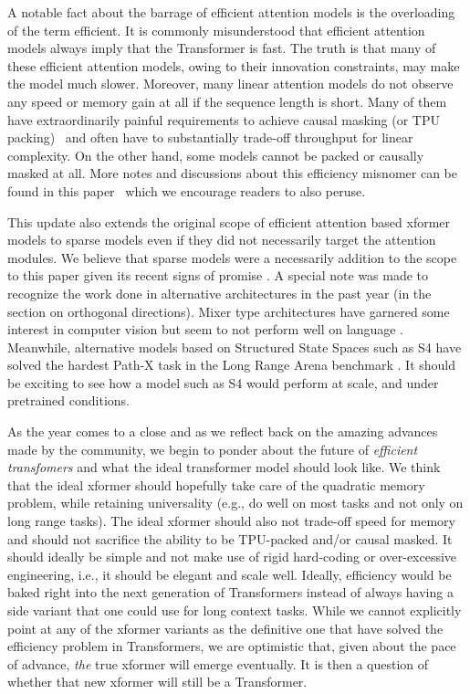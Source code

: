 A notable fact about the barrage of efficient attention models is the overloading of the term efficient. It is commonly misunderstood that efficient attention models always imply that the Transformer is fast. The truth is that many of these efficient attention models, owing to their innovation constraints, may make the model much slower. Moreover, many linear attention models do not observe any speed or memory gain at all if the sequence length is short. Many of them have extraordinarily painful requirements to achieve causal masking (or TPU packing)~\citep{choromanski2020rethinking,peng2021random,wang2020linformer} and often have to substantially trade-off throughput for linear complexity. On the other hand, some models cannot be packed or causally masked at all. More notes and discussions about this efficiency misnomer can be found in this paper~\citep{dehghani2021efficiency} which we encourage readers to also peruse.

This update also extends the original scope of efficient attention based xformer models to sparse models even if they did not necessarily target the attention modules. We believe that sparse models were a necessarily addition to the scope to this paper given its recent signs of promise \citep{fedus2021switch,du2021glam,zoph2022designing}. A special note was made to recognize the work done in alternative architectures in the past year (in the section on orthogonal directions). Mixer type architectures \citep{tolstikhin2021mlp} have garnered some interest in computer vision but seem to not perform well on language \citep{anonymous2021remixer}. Meanwhile, alternative models based on Structured State Spaces such as S4 \citep{gu2021efficiently} have solved the hardest Path-X task in the Long Range Arena benchmark \citep{tay2020long}. It should be exciting to see how a model such as S4 would perform at scale, and under pretrained conditions.

As the year comes to a close and as we reflect back on the amazing advances made by the community, we begin to ponder about the future of \textit{efficient transfomers} and what the ideal transformer model should look like. We think that the ideal xformer should hopefully take care of the quadratic memory problem, while retaining universality (e.g., do well on most tasks and not only on long range tasks). The ideal xformer should also not trade-off speed for memory and should not sacrifice the ability to be TPU-packed and/or causal masked. It should ideally be simple and not make use of rigid hard-coding or over-excessive engineering, i.e., it should be elegant and scale well. Ideally, efficiency would be baked right into the next generation of Transformers instead of always having a side variant that one could use for long context tasks. While we cannot explicitly point at any of the xformer variants as the definitive one that have solved the efficiency problem in Transformers, we are optimistic that, given about the pace of advance, \textit{the} true xformer will emerge eventually. It is then a question of whether that new xformer will still be a Transformer. 

